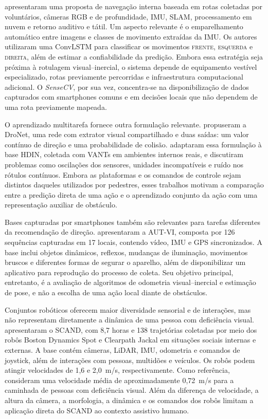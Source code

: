 \documentclass[conference]{IEEEtran}
\newcommand{\sensecv}{\textit{SenseCV}}
\begin{document}
\cite{plikynas2022} apresentaram uma proposta de navegação interna baseada em rotas coletadas por voluntários, câmeras RGB e de profundidade, IMU, SLAM, processamento em nuvem e retorno auditivo e tátil. Um aspecto relevante é o emparelhamento automático entre imagens e classes de movimento extraídas da IMU. Os autores utilizaram uma ConvLSTM para classificar os movimentos \textsc{frente}, \textsc{esquerda} e \textsc{direita}, além de estimar a confiabilidade da predição. Embora essa estratégia seja próxima à rotulagem visual--inercial, o sistema depende de equipamento vestível especializado, rotas previamente percorridas e infraestrutura computacional adicional. O \sensecv{}, por sua vez, concentra-se na disponibilização de dados capturados com smartphones comuns e em decisões locais que não dependem de uma rota previamente mapeada.

O aprendizado multitarefa fornece outra formulação relevante. \cite{loquercio2018} propuseram a DroNet, uma rede com extrator visual compartilhado e duas saídas: um valor contínuo de direção e uma probabilidade de colisão. \cite{chang2022} adaptaram essa formulação à base HDIN, coletada com VANTs em ambientes internos reais, e discutiram problemas como oscilações dos sensores, unidades incompatíveis e ruído nos rótulos contínuos. Embora as plataformas e os comandos de controle sejam distintos daqueles utilizados por pedestres, esses trabalhos motivam a comparação entre a predição direta de uma ação e o aprendizado conjunto da ação com uma representação auxiliar de obstáculo.

Bases capturadas por smartphones também são relevantes para tarefas diferentes da recomendação de direção. \cite{samadzadeh2024} apresentaram a AUT-VI, composta por 126 sequências capturadas em 17 locais, contendo vídeo, IMU e GPS sincronizados. A base inclui objetos dinâmicos, reflexos, mudanças de iluminação, movimentos bruscos e diferentes formas de segurar o aparelho, além de disponibilizar um aplicativo para reprodução do processo de coleta. Seu objetivo principal, entretanto, é a avaliação de algoritmos de odometria visual--inercial e estimação de pose, e não a escolha de uma ação local diante de obstáculos.

Conjuntos robóticos oferecem maior diversidade sensorial e de interações, mas não representam diretamente a dinâmica de uma pessoa com deficiência visual. \cite{karnan2022scand} apresentaram o SCAND, com 8,7 horas e 138 trajetórias coletadas por meio dos robôs Boston Dynamics Spot e Clearpath Jackal em situações sociais internas e externas. A base contém câmeras, LiDAR, IMU, odometria e comandos de joystick, além de interações com pessoas, multidões e veículos. Os robôs podem atingir velocidades de 1,6 e 2,0~m/s, respectivamente. Como referência, \cite{liu2019travel} consideram uma velocidade média de aproximadamente 0,72~m/s para a caminhada de pessoas com deficiência visual. Além da diferença de velocidade, a altura da câmera, a morfologia, a dinâmica e os comandos dos robôs limitam a aplicação direta do SCAND ao contexto assistivo humano.
\end{document}
